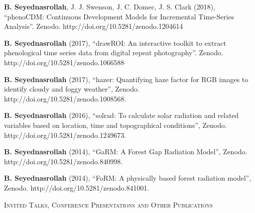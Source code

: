 \documentclass[10pt]{article}
\newenvironment{changemargin}[2]{%
  \begin{list}{}{%
 \setlength{\topsep}{0pt}%
 \setlength{\leftmargin}{#1}%
 \setlength{\rightmargin}{#2}%
 \setlength{\listparindent}{\parindent}%
 \setlength{\itemindent}{\parindent}%
 \setlength{\parsep}{\parskip}%
  }%
  \item[]}{\end{list}
}
\newcommand{\lineover}{
  \begin{changemargin}{-0.05in}{-0.05in}
  \vspace*{-8pt}
  \hrulefill \\
  \vspace*{-2pt}
  \end{changemargin}
}
\newcommand{\header}[1]{
  \begin{changemargin}{-0.5in}{-0.5in}
  \scshape{#1}\\
  \lineover
  \end{changemargin}
}
\newenvironment{body} {
  \vspace*{-2pt}
  \begin{changemargin}{-0.5in}{-0.5in}
}
{\end{changemargin}
}
\begin{document}
\begin{body}
\begin{etaremune}
    \item \textbf{B. Seyednasrollah}, J. J. Swenson, J. C. Domec, J. S. Clark (2018),  ``phenoCDM: Continuous Development Models for Incremental Time-Series Analysis''. Zenodo. http://doi.org/10.5281/zenodo.1204614\\
    \medskip

    \item \textbf{B. Seyednasrollah} (2017), ``drawROI: An interactive toolkit to extract phenological time series data from digital repeat photography''. Zenodo. http://doi.org/10.5281/zenodo.1066588\\
    \medskip

    \item \textbf{B. Seyednasrollah} (2017), ``hazer: Quantifying haze factor for RGB images to identify cloudy and foggy weather'', Zenodo. http://doi.org/10.5281/zenodo.1008568. \\ \medskip

    \item \textbf{B. Seyednasrollah} (2016), ``solrad: To calculate solar radiation and related variables based on location, time and topographical conditions'', Zenodo. http://doi.org/10.5281/zenodo.1249673. \\
    \medskip

    \item \textbf{B. Seyednasrollah} (2014), ``GaRM: A Forest Gap Radiation Model'', Zenodo. http://doi.org/10.5281/zenodo.840998. \\
    \medskip

    \item \textbf{B. Seyednasrollah} (2014), ``FoRM: A physically based forest radiation model'', Zenodo. http://doi.org/10.5281/zenodo.841001. \\
    \medskip

  \end{etaremune}

\end{body}

\medskip



\header{Invited Talks, Conference Presentations and Other Publications}
\end{document}
